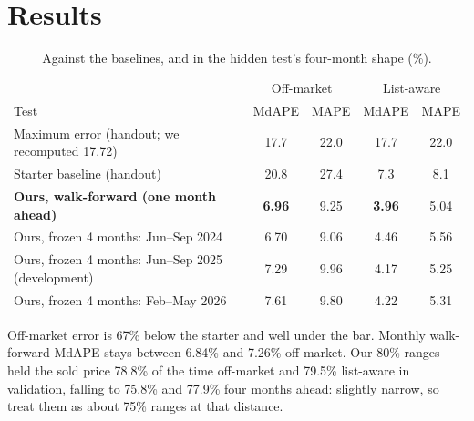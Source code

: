 \documentclass[11pt]{article}
\begin{document}
\section{Results}
\begin{table}[!ht]
\centering\small

\caption{Required walk-forward validation, Dec 2025 to May 2026. Brackets: bootstrap 95\% interval, treating homes as independent.}
\end{table}
\vspace{-6pt}
\begin{table}[!ht]
\centering\small
\begin{tabular}{lcccc}
\toprule
& \multicolumn{2}{c}{Off-market} & \multicolumn{2}{c}{List-aware} \\
Test & MdAPE & MAPE & MdAPE & MAPE \\
\midrule
Maximum error (handout; we recomputed 17.72) & 17.7 & 22.0 & 17.7 & 22.0 \\
Starter baseline (handout) & 20.8 & 27.4 & 7.3 & 8.1 \\
\textbf{Ours, walk-forward (one month ahead)} & \textbf{6.96} & 9.25 & \textbf{3.96} & 5.04 \\
Ours, frozen 4 months: Jun--Sep 2024 & 6.70 & 9.06 & 4.46 & 5.56 \\
Ours, frozen 4 months: Jun--Sep 2025 (development) & 7.29 & 9.96 & 4.17 & 5.25 \\
Ours, frozen 4 months: Feb--May 2026 & 7.61 & 9.80 & 4.22 & 5.31 \\
\bottomrule
\end{tabular}
\caption{Against the baselines, and in the hidden test's four-month shape (\%).}
\end{table}

Off-market error is 67\% below the starter and well under the bar. Monthly walk-forward MdAPE stays between 6.84\% and 7.26\% off-market. Our 80\% ranges held the sold price 78.8\% of the time off-market and 79.5\% list-aware in validation, falling to 75.8\% and 77.9\% four months ahead: slightly narrow, so treat them as about 75\% ranges at that distance.
\end{document}
